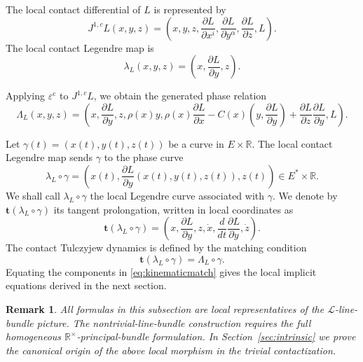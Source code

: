 \documentclass[11pt]{article}
\newtheorem{remark}[theorem]{Remark}
\newcommand{\R}{\mathbb{R}}
\newcommand{\epsc}{\varepsilon^{\mathrm c}}
\begin{document}
The local contact differential of \(L\) is represented by
\[
J^{1,c}L(x,y,z)
=
\left(
 x,y,z,
 \frac{\partial L}{\partial x^i},
 \frac{\partial L}{\partial y^\alpha},
 \frac{\partial L}{\partial z},
 L
\right).
\]
The local contact Legendre map is
\begin{equation}
    \label{CLM}
        \lambda_L(x,y,z)
        =
        \left(
        x,\frac{\partial L}{\partial y},z
        \right).\end{equation}

Applying \(\epsc\) to \(J^{1,c}L\), we obtain the generated phase relation
\[
\Lambda_L(x,y,z)
=
\left(
 x,\frac{\partial L}{\partial y},z,
 \rho(x)y,
 \rho(x)\frac{\partial L}{\partial x}
 -
 C(x)\left(y,\frac{\partial L}{\partial y}\right)
 +
 \frac{\partial L}{\partial z}\frac{\partial L}{\partial y},
 L
\right).
\]

Let $\gamma(t)=(x(t),y(t),z(t))$ be a curve in \(E\times\R\). The local contact Legendre map sends
\(\gamma\) to the phase curve
\[
        \lambda_L\circ\gamma
        =
        \left(
        x(t),
        \frac{\partial L}{\partial y}(x(t),y(t),z(t)),
        z(t)
        \right)
        \in E^*\times\R .
\]
We shall call $\lambda_L\circ\gamma$ the local Legendre curve associated with \(\gamma\).
We denote by $\mathbf t(\lambda_L\circ\gamma)$ its tangent
prolongation, written in local coordinates as
\begin{equation}\label{tangprolong}
 \mathbf t(\lambda_L\circ\gamma)
        =
        \left(
        x,
        \frac{\partial L}{\partial y},
        z,
        \dot x,
        \frac{d}{dt}\frac{\partial L}{\partial y},
        \dot z
        \right).
\end{equation}
The contact Tulczyjew dynamics is defined by the matching condition
\begin{equation}
        \mathbf t(\lambda_L\circ\gamma)
        =
        \Lambda_L\circ\gamma .
\label{eq:kinematicmatch}
\end{equation}
Equating the components in \eqref{eq:kinematicmatch} gives the local
implicit equations derived in the next section.

\begin{remark}
All formulas in this subsection are local representatives of the
\(\mathcal L\)-line-bundle picture. The nontrivial-line-bundle construction
requires the full homogeneous \(\mathbb R^\times\)-principal-bundle formulation. In
Section~\ref{sec:intrinsic} we prove the canonical origin of the above local morphism in the
trivial contactization.
\end{remark}
\end{document}
